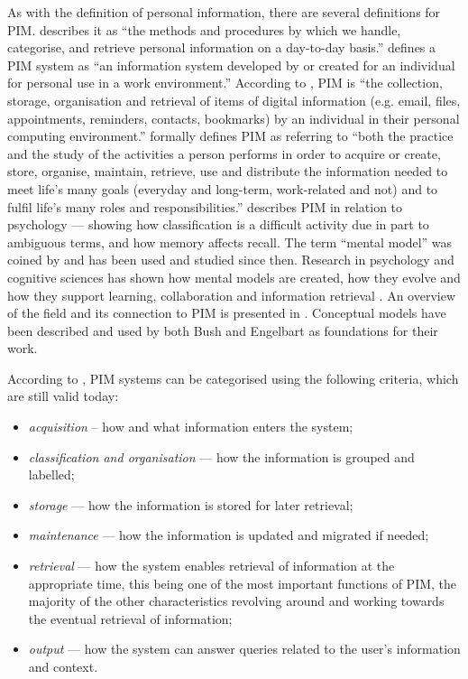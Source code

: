 As with the definition of personal information, there are several definitions for PIM. \cite{Lansdale1988} describes it as ``the methods and procedures by which we handle, categorise, and retrieve personal information on a day-to-day basis.'' \cite{Barreau1995b} defines a PIM system as ``an information system developed by or created for an individual for personal use in a work environment.'' According to \cite{Boardman2004}, PIM is ``the collection, storage, organisation and retrieval of items of digital information (e.g. email, files, appointments, reminders, contacts, bookmarks) by an individual in their personal computing environment.'' \cite{Jones2008KFTFBook} formally defines PIM as referring to ``both the practice and the study of the activities a person performs in order to acquire or create, store, organise, maintain, retrieve, use and distribute the information needed to meet life's many goals (everyday and long-term, work-related and not) and to fulfil life's many roles and responsibilities.'' 
\cite{Lansdale1988} describes PIM in relation to psychology --- showing how classification is a difficult activity due in part to ambiguous terms, and how memory affects recall.
The term ``mental model'' was coined by \cite{Craik1943} and has been used and studied \cite{Norman1983,Paivio1986,Johnson-Laird1989} since then. Research in psychology and cognitive sciences has shown how mental models are created, how they evolve and how they support learning, collaboration and information retrieval \cite{Jarvelin2003,Payne2003,Jones2011}. An overview of the field and its connection to PIM is presented in \cite{Nadeen2007}. Conceptual models have been described and used by both Bush and Engelbart as foundations for their work.

According to \cite{Barreau1995b}, PIM systems can be categorised using the following criteria, which are still valid today:
\begin{itemize}
 \item \emph{acquisition} -- how and what information enters the system; 
 \item \emph{classification and organisation} --- how the information is grouped and labelled;
 \item \emph{storage} --- how the information is stored for later retrieval; 
 \item \emph{maintenance} --- how the information is updated and migrated if needed; 
 \item \emph{retrieval} --- how the system enables retrieval of information at the appropriate time, this being one of the most important functions of PIM, the majority of the other characteristics revolving around and working towards the eventual retrieval of information; 
 \item \emph{output} --- how the system can answer queries related to the user's information and context.
\end{itemize}

